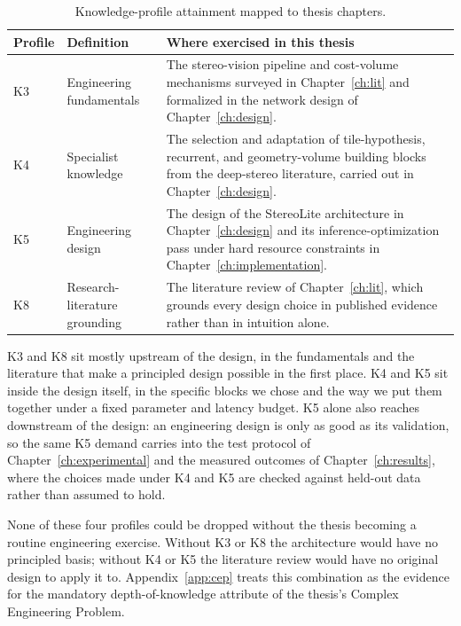 \begin{table}[!htbp]
\centering
\caption{Knowledge-profile attainment mapped to thesis chapters.}
\label{tab:kp_profile}
\small
\begin{tabular}{lp{4.0cm}p{7.4cm}}
\toprule
Profile & Definition & Where exercised in this thesis\\
\midrule
K3 & Engineering fundamentals & The stereo-vision pipeline and cost-volume mechanisms surveyed in Chapter~\ref{ch:lit} and formalized in the network design of Chapter~\ref{ch:design}.\\
K4 & Specialist knowledge & The selection and adaptation of tile-hypothesis, recurrent, and geometry-volume building blocks from the deep-stereo literature, carried out in Chapter~\ref{ch:design}.\\
K5 & Engineering design & The design of the StereoLite architecture in Chapter~\ref{ch:design} and its inference-optimization pass under hard resource constraints in Chapter~\ref{ch:implementation}.\\
K8 & Research-literature grounding & The literature review of Chapter~\ref{ch:lit}, which grounds every design choice in published evidence rather than in intuition alone.\\
\bottomrule
\end{tabular}
\end{table}

K3 and K8 sit mostly upstream of the design, in the fundamentals and
the literature that make a principled design possible in the first
place. K4 and K5 sit inside the design itself, in the specific blocks
we chose and the way we put them together under a fixed parameter and
latency budget. K5 alone also reaches downstream of the design: an
engineering design is only as good as its validation, so the same K5
demand carries into the test protocol of Chapter~\ref{ch:experimental}
and the measured outcomes of Chapter~\ref{ch:results}, where the
choices made under K4 and K5 are checked against held-out data rather
than assumed to hold.

None of these four profiles could be dropped without the thesis
becoming a routine engineering exercise. Without K3 or K8 the
architecture would have no principled basis; without K4 or K5 the
literature review would have no original design to apply it to.
Appendix~\ref{app:cep} treats this combination as the evidence for the
mandatory depth-of-knowledge attribute of the thesis's Complex
Engineering Problem.

